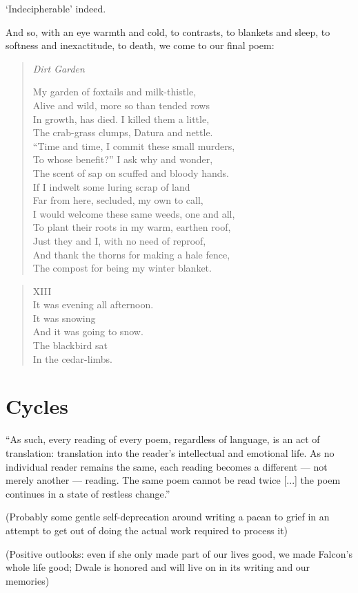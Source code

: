 \documentclass[12pt,oneside]{memoir}
\begin{document}
`Indecipherable' indeed.

And so, with an eye warmth and cold, to contrasts, to blankets and sleep, to softness and inexactitude, to death, we come to our final poem:

\begin{verse}
\emph{Dirt Garden}

My garden of foxtails and milk-thistle, \\
Alive and wild, more so than tended rows \\
In growth, has died. I killed them a little, \\
The crab-grass clumps, Datura and nettle. \\
``Time and time, I commit these small murders, \\
To whose benefit?'' I ask why and wonder, \\
The scent of sap on scuffed and bloody hands. \\
If I indwelt some luring scrap of land \\
Far from here, secluded, my own to call, \\
I would welcome these same weeds, one and all, \\
To plant their roots in my warm, earthen roof, \\
Just they and I, with no need of reproof, \\
And thank the thorns for making a hale fence, \\
The compost for being my winter blanket.

\parencite[5]{leaves}
\end{verse}

\begin{verse}
XIII \\
It was evening all afternoon. \\
It was snowing \\
And it was going to snow. \\
The blackbird sat \\
In the cedar-limbs.

\parencite{blackbird}
\end{verse}

\section*{Cycles}

``As such, every reading of every poem, regardless of language, is an act of translation: translation into the reader's intellectual and emotional life. As no individual reader remains the same, each reading becomes a different --- not merely another --- reading. The same poem cannot be read twice [...] the poem continues in a state of restless change.'' \parencite[46]{weinberger_paz_2016}

(Probably some gentle self-deprecation around writing a paean to grief in an attempt to get out of doing the actual work required to process it)

(Positive outlooks: even if she only made part of our lives good, we made Falcon's whole life good; Dwale is honored and will live on in its writing and our memories)


\printbibliography
\end{document}
